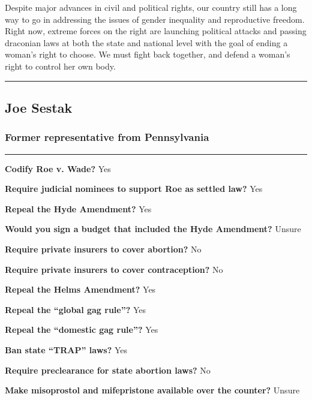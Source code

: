 Despite major advances in civil and political rights, our country still
has a long way to go in addressing the issues of gender inequality and
reproductive freedom. Right now, extreme forces on the right are
launching political attacks and passing draconian laws at both the state
and national level with the goal of ending a woman's right to choose. We
must fight back together, and defend a woman's right to control her own
body.

\begin{center}\rule{0.5\linewidth}{\linethickness}\end{center}

\hypertarget{joe-sestak}{%
\subsection{Joe Sestak}\label{joe-sestak}}

\hypertarget{former-representative-from-pennsylvania}{%
\subsubsection{Former representative from
Pennsylvania}\label{former-representative-from-pennsylvania}}

\begin{center}\rule{0.5\linewidth}{\linethickness}\end{center}

\textbf{Codify Roe v. Wade?} Yes

\textbf{Require judicial nominees to support Roe as settled law?} Yes

\textbf{Repeal the Hyde Amendment?} Yes

\textbf{Would you sign a budget that included the Hyde Amendment?}
Unsure

\textbf{Require private insurers to cover abortion?} No

\textbf{Require private insurers to cover contraception?} No

\textbf{Repeal the Helms Amendment?} Yes

\textbf{Repeal the ``global gag rule''?} Yes

\textbf{Repeal the ``domestic gag rule''?} Yes

\textbf{Ban state ``TRAP'' laws?} Yes

\textbf{Require preclearance for state abortion laws?} No

\textbf{Make misoprostol and mifepristone available over the counter?}
Unsure

